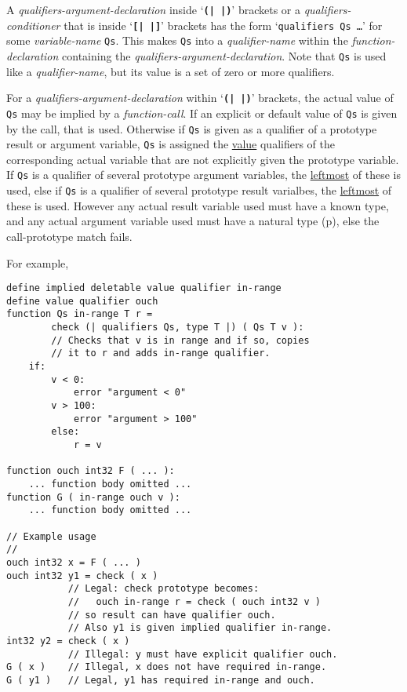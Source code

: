 \documentclass[12pt]{article}
\newcommand{\TT}[1]{{\tt \bfseries #1}}
\newcommand{\pagref}[1]{p\pageref{#1}}
\newenvironment{indpar}[1][0.3in]%
	{\begin{list}{}%
		     {\setlength{\itemsep}{0in}%
		      \setlength{\topsep}{0in}%
		      \setlength{\parsep}{1ex}%
		      \setlength{\labelwidth}{#1}%
		      \setlength{\leftmargin}{#1}%
		      \addtolength{\leftmargin}{\labelsep}}%
	 \item}%
	{\end{list}}
\begin{document}
A {\em qualifiers-argument-declaration}
\label{QUALIFIERS-ARGUMENT-DECLARATION-DISCUSSION}
inside `\TT{(|\,|)}' brackets or
a {\em qualifiers-conditioner} that is inside `\TT{[|\,|]}' brackets has the
form `{\tt qualifiers Qs \ldots}' for some {\em variable-name} {\tt Qs}.
This makes {\tt Qs} into a {\em qualifier-name}
within the {\em function-de\-clar\-a\-tion}
containing the {\em qualifiers-argument-de\-clar\-a\-tion}.  Note that {\tt Qs}
is used like a {\em qualifier-name}, but its value is a set of
zero or more qualifiers.

For a {\em qualifiers-argument-declaration}
within `\TT{(|\,|)}' brackets,
the actual value of {\tt Qs} may be implied by a {\em function-call}.
If an explicit or default value of {\tt Qs} is given by the call, that is used.
Otherwise if {\tt Qs} is given as a qualifier
of a prototype result or argument variable,
{\tt Qs} is assigned the \underline{value} qualifiers of the
corresponding actual variable that are not explicitly given the
prototype variable.  If {\tt Qs} is a qualifier of several prototype
argument variables, the \underline{leftmost} of these
is used, else if {\tt Qs} is a qualifier of several prototype result
varialbes, the \underline{leftmost} of these is used.
However any actual result variable used must have
a known type, and any actual argument variable used must have
a natural type (\pagref{NATURAL-TYPE}), else the call-prototype match
fails.

For example,
\begin{indpar}\begin{verbatim}
define implied deletable value qualifier in-range
define value qualifier ouch
function Qs in-range T r =
        check (| qualifiers Qs, type T |) ( Qs T v ):
        // Checks that v is in range and if so, copies
        // it to r and adds in-range qualifier.
    if:
        v < 0:
            error "argument < 0"
        v > 100:
            error "argument > 100"
        else:
            r = v

function ouch int32 F ( ... ):
    ... function body omitted ...
function G ( in-range ouch v ):
    ... function body omitted ...

// Example usage
//
ouch int32 x = F ( ... )
ouch int32 y1 = check ( x )
           // Legal: check prototype becomes:
           //   ouch in-range r = check ( ouch int32 v )
           // so result can have qualifier ouch.
           // Also y1 is given implied qualifier in-range.
int32 y2 = check ( x )
           // Illegal: y must have explicit qualifier ouch.
G ( x )    // Illegal, x does not have required in-range.
G ( y1 )   // Legal, y1 has required in-range and ouch.
\end{verbatim}\end{indpar}
\end{document}
